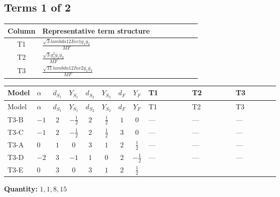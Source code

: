 \documentclass[8pt]{article}
\begin{document}
\begin{landscape}
\subsection*{Terms 1 of 2}
\begin{center}
\begin{tabular}{@{}c >{\raggedright\arraybackslash}p{0.82\linewidth}@{}}
\toprule
Column & Representative term structure \\
\midrule
T1 & \(\displaystyle \frac{\sqrt{3} lambda12Inv1 \overline{y_{1}} \overline{y_{2}}}{MF}\) \\
\midrule
T2 & \(\displaystyle \frac{\sqrt{3} g_{1}^{2} \overline{y_{1}} \overline{y_{2}}}{MF}\) \\
\midrule
T3 & \(\displaystyle \frac{\sqrt{11} lambda12Inv2 \overline{y_{1}} \overline{y_{2}}}{MF}\) \\
\midrule
\bottomrule
\end{tabular}
\end{center}
\smallskip
\tiny
\begin{longtable}{@{}llcccccc >{\raggedright\arraybackslash}p{0.21\linewidth} >{\raggedright\arraybackslash}p{0.21\linewidth} >{\raggedright\arraybackslash}p{0.21\linewidth}@{}}
\toprule
Model & $\alpha$ & $d_{S_1}$ & $Y_{S_1}$ & $d_{S_2}$ & $Y_{S_2}$ & $d_F$ & $Y_F$ & T1 & T2 & T3 \\
\midrule
\endfirsthead
\toprule
Model & $\alpha$ & $d_{S_1}$ & $Y_{S_1}$ & $d_{S_2}$ & $Y_{S_2}$ & $d_F$ & $Y_F$ & T1 & T2 & T3 \\
\midrule
\endhead
T3-B & $-1$ & $2$ & $-\frac{1}{2}$ & $2$ & $\frac{1}{2}$ & $1$ & $0$ & --- & --- & --- \\
\midrule
T3-C & $-1$ & $2$ & $-\frac{1}{2}$ & $2$ & $\frac{1}{2}$ & $3$ & $0$ & --- & --- & --- \\
\midrule
T3-A & $0$ & $1$ & $0$ & $3$ & $1$ & $2$ & $\frac{1}{2}$ & --- & --- & --- \\
\midrule
T3-D & $-2$ & $3$ & $-1$ & $1$ & $0$ & $2$ & $-\frac{1}{2}$ & --- & --- & --- \\
\midrule
T3-E & $0$ & $3$ & $0$ & $3$ & $1$ & $2$ & $\frac{1}{2}$ & \scriptsize\adjustbox{max width=\linewidth}{$\begin{gathered} - \frac{\sqrt{3} lambda12Inv1 \overline{y_{1}} \overline{y_{2}}}{6 MF}\end{gathered}$} & \scriptsize\adjustbox{max width=\linewidth}{$\begin{gathered} \frac{\sqrt{3} g_{1}^{2} \overline{y_{1}} \overline{y_{2}}}{8 MF}\end{gathered}$} & \scriptsize\adjustbox{max width=\linewidth}{$\begin{gathered} \frac{3 \sqrt{11} lambda12Inv2 \overline{y_{1}} \overline{y_{2}}}{22 MF}\end{gathered}$} \\
\midrule
\bottomrule
\end{longtable}
\clearpage
\noindent\textbf{Quantity: }$\mathrm{1,1,8,15}$\par\smallskip

\end{landscape}
\end{document}
